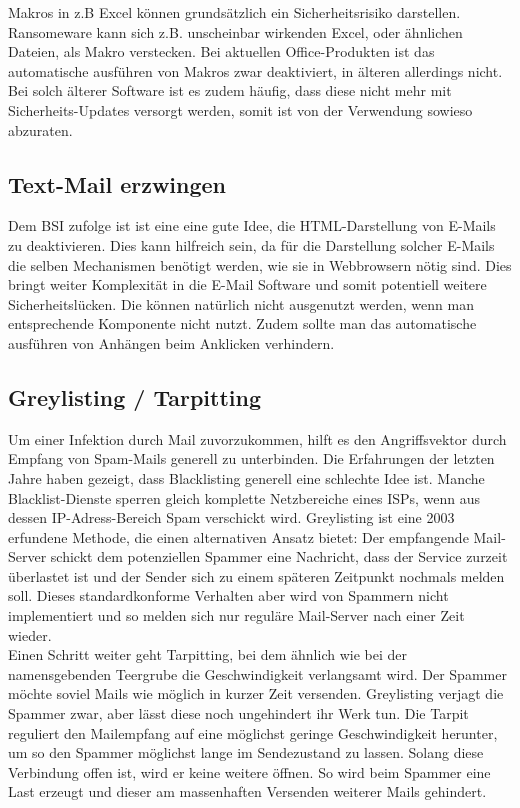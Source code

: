 	Makros in z.B Excel können grundsätzlich ein Sicherheitsrisiko darstellen. Ransomeware kann sich z.B. unscheinbar wirkenden Excel, oder ähnlichen Dateien, als Makro verstecken. Bei aktuellen Office-Produkten ist das automatische ausführen von Makros zwar deaktiviert, in älteren allerdings nicht. Bei solch älterer Software ist es zudem häufig, dass diese nicht mehr mit Sicherheits-Updates versorgt werden, somit ist von der Verwendung sowieso abzuraten. 
	
\subsection{Text-Mail erzwingen}

	Dem BSI zufolge ist ist eine eine gute Idee, die HTML-Darstellung von E-Mails zu deaktivieren. Dies kann hilfreich sein, da für die Darstellung solcher E-Mails die selben Mechanismen benötigt werden, wie sie in Webbrowsern nötig sind. Dies bringt weiter Komplexität in die E-Mail Software und somit potentiell weitere Sicherheitslücken. Die können natürlich nicht ausgenutzt werden, wenn man entsprechende Komponente nicht nutzt. Zudem sollte man das automatische ausführen von Anhängen beim Anklicken verhindern. \cite{bsi:ransome}
	
	
\subsection{Greylisting / Tarpitting}
	
	Um einer Infektion durch Mail zuvorzukommen, hilft es den Angriffsvektor durch Empfang von Spam-Mails generell zu unterbinden. Die Erfahrungen der letzten Jahre haben gezeigt, dass Blacklisting generell eine schlechte Idee ist. Manche Blacklist-Dienste sperren gleich komplette Netzbereiche eines ISPs, wenn aus dessen IP-Adress-Bereich Spam verschickt wird. Greylisting ist eine 2003 erfundene Methode, die einen alternativen Ansatz bietet: Der empfangende Mail-Server schickt dem potenziellen Spammer eine Nachricht, dass der Service zurzeit überlastet ist und der Sender sich zu einem späteren Zeitpunkt nochmals melden soll. Dieses standardkonforme Verhalten aber wird von Spammern nicht implementiert und so melden sich nur reguläre Mail-Server nach einer Zeit wieder. \cite{greylisting} \\
	Einen Schritt weiter geht \glqq Tarpitting\grqq, bei dem ähnlich wie bei der namensgebenden Teergrube die Geschwindigkeit verlangsamt wird. Der Spammer möchte soviel Mails wie möglich in kurzer Zeit versenden. Greylisting verjagt die Spammer zwar, aber lässt diese noch ungehindert ihr Werk tun. Die Tarpit reguliert den Mailempfang auf eine möglichst geringe Geschwindigkeit herunter, um so den Spammer möglichst lange im Sendezustand zu lassen. Solang diese Verbindung offen ist, wird er keine weitere öffnen. So wird beim Spammer eine Last erzeugt und dieser am massenhaften Versenden weiterer Mails gehindert.
	

